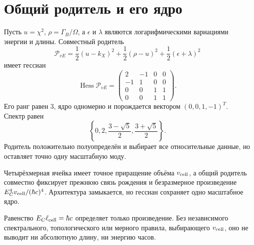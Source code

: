 \section{Общий родитель и его ядро}

Пусть $u=\chi^2$, $\rho=\Gamma_B/\Omega$, а $\epsilon$ и $\lambda$
являются логарифмическими вариациями энергии и длины. Совместный родитель
\begin{equation}
 \mathcal P_{vE}
 =\frac12(u-k_X)^2+\frac12(\rho-u)^2
 +\frac12(\epsilon+\lambda)^2
 \label{eq:v10-cell-volume-common-parent}
\end{equation}
имеет гессиан
\begin{equation}
 \operatorname{Hess}\mathcal P_{vE}=
 \begin{pmatrix}
 2&-1&0&0\\-1&1&0&0\\0&0&1&1\\0&0&1&1
 \end{pmatrix}.
 \label{eq:v10-cell-volume-parent-hessian}
\end{equation}
Его ранг равен $3$, ядро одномерно и порождается вектором
$(0,0,1,-1)^T$. Спектр равен
\begin{equation}
 \left\{0,2,\frac{3-\sqrt5}{2},\frac{3+\sqrt5}{2}\right\}.
 \label{eq:v10-cell-volume-parent-spectrum}
\end{equation}
Родитель положительно полуопределён и выбирает все относительные данные,
но оставляет точно одну масштабную моду.

\begin{theorem}
Четырёхмерная ячейка имеет точное приращение объёма $v_{\rm cell}$, а
общий родитель совместно фиксирует прежнюю связь рождения и безразмерное
произведение $E_C^4v_{\rm cell}/(\hbar c)^4$. Архитектура замыкается, но
гессиан сохраняет одно масштабное ядро.
\end{theorem}

\begin{nogocriterion}
Равенство $E_C\ell_{\rm cell}=\hbar c$ определяет только произведение.
Без независимого спектрального, топологического или мерного правила,
выбирающего $v_{\rm cell}$, оно не выводит ни абсолютную длину, ни энергию
часов.
\end{nogocriterion}

